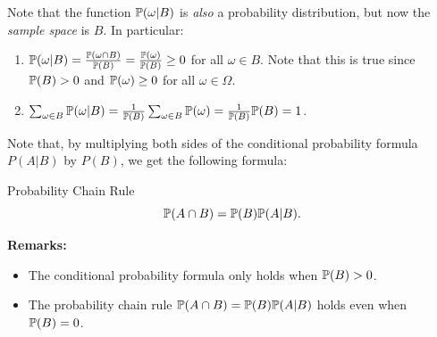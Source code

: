 Note that the function $\mathbb{P}(\omega | B)$ is \emph{also} a probability distribution, but now the \emph{sample space} is $B$. In particular:
\begin{enumerate}
    \item $\mathbb{P}(\omega | B) = \frac{\mathbb{P}(\omega \cap B)}{\mathbb{P}(B)} = \frac{\mathbb{P}(\omega)}{\mathbb{P}(B)} \geq 0$ for all $\omega \in B$. Note that this is true since $\mathbb{P}(B) > 0$ and $\mathbb{P}(\omega) \geq 0$ for all $\omega \in \Omega$. 
    \item $\sum_{\omega \in B} \mathbb{P}(\omega | B) = \frac{1}{\mathbb{P}(B)} \sum_{\omega \in B} \mathbb{P}(\omega) = \frac{1}{\mathbb{P}(B)} \mathbb{P}(B) = 1$. 
\end{enumerate}
Note that, by multiplying both sides of the conditional probability formula $P(A | B)$ by $P(B)$, we get the following formula:
\begin{theorem}{Probability Chain Rule}{}
    \[\mathbb{P}(A \cap B) = \mathbb{P}(B) \mathbb{P}(A | B).\]
\end{theorem}
\textbf{Remarks:}
\begin{itemize}
    \item The conditional probability formula only holds when $\mathbb{P}(B) > 0$. 
    \item The probability chain rule $\mathbb{P}(A \cap B) = \mathbb{P}(B) \mathbb{P}(A | B)$ holds even when $\mathbb{P}(B) = 0$. 
\end{itemize}

